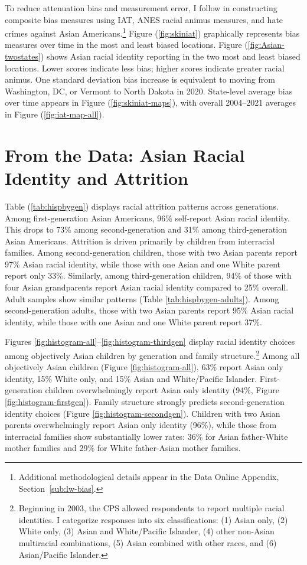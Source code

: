 To reduce attenuation bias and measurement error, I follow \textcite{lubotskyInterpretationRegressionsMultiple2006} in constructing composite bias measures using IAT, ANES racial animus measures, and hate crimes against Asian Americans.\footnote{Additional methodological details appear in the Data Online Appendix, Section~\ref{sub:lw-bias}.} Figure (\ref{fig:skiniat}) graphically represents bias measures over time in the most and least biased locations. Figure (\ref{fig:Asian-twostates}) shows Asian racial identity reporting in the two most and least biased locations. Lower scores indicate less bias; higher scores indicate greater racial animus. One standard deviation bias increase is equivalent to moving from Washington, DC, or Vermont to North Dakota in 2020. State-level average bias over time appears in Figure (\ref{fig:skiniat-maps}), with overall 2004--2021 averages in Figure (\ref{fig:iat-map-all}).

\section{From the Data: Asian Racial Identity and Attrition}\label{sec:attrition}

Table (\ref{tab:hispbygen}) displays racial attrition patterns across generations. Among first-generation Asian Americans, 96\% self-report Asian racial identity. This drops to 73\% among second-generation and 31\% among third-generation Asian Americans. Attrition is driven primarily by children from interracial families. Among second-generation children, those with two Asian parents report 97\% Asian racial identity, while those with one Asian and one White parent report only 33\%. Similarly, among third-generation children, 94\% of those with four Asian grandparents report Asian racial identity compared to 25\% overall. Adult samples show similar patterns (Table \ref{tab:hispbygen-adults}). Among second-generation adults, those with two Asian parents report 95\% Asian racial identity, while those with one Asian and one White parent report 37\%.

Figures \ref{fig:histogram-all}--\ref{fig:histogram-thirdgen} display racial identity choices among objectively Asian children by generation and family structure.\footnote{Beginning in 2003, the CPS allowed respondents to report multiple racial identities. I categorize responses into six classifications: (1) Asian only, (2) White only, (3) Asian and White/Pacific Islander, (4) other non-Asian multiracial combinations, (5) Asian combined with other races, and (6) Asian/Pacific Islander.} Among all objectively Asian children (Figure \ref{fig:histogram-all}), 63\% report Asian only identity, 15\% White only, and 15\% Asian and White/Pacific Islander. First-generation children overwhelmingly report Asian only identity (94\%, Figure \ref{fig:histogram-firstgen}). Family structure strongly predicts second-generation identity choices (Figure \ref{fig:histogram-secondgen}). Children with two Asian parents overwhelmingly report Asian only identity (96\%), while those from interracial families show substantially lower rates: 36\% for Asian father-White mother families and 29\% for White father-Asian mother families.

